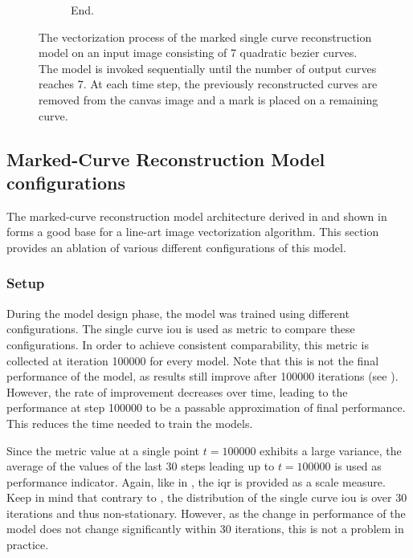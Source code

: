 \begin{figure}
\begin{subfigure}{.1\textwidth}
        \caption{End.}
    \end{subfigure}
    \caption{The vectorization process of the marked single curve reconstruction model on an input image consisting of 7 quadratic bezier curves. The model is invoked sequentially until the number of output curves reaches 7. At each time step, the previously reconstructed curves are removed from the canvas image and a mark is placed on a remaining curve.}
    \label{fig:marked.3.process}
\end{figure}


\subsection{Marked-Curve Reconstruction Model configurations}
\label{subsec:ablation.configs}

The marked-curve reconstruction model architecture derived in  and shown in  forms a good base for a line-art image vectorization algorithm. This section provides an ablation of various different configurations of this model.

\subsubsection{Setup}

During the model design phase, the model was trained using different configurations. The single curve \gls{iou} is used as metric to compare these configurations. In order to achieve consistent comparability, this metric is collected at iteration \num{100000} for every model. Note that this is not the final performance of the model, as results still improve after \num{100000} iterations (see ). However, the rate of improvement decreases over time, leading to the performance at step \num{100000} to be a passable approximation of final performance. This reduces the time needed to train the models.

Since the metric value at a single point $t=100000$ exhibits a large variance, the average of the values of the last 30 steps leading up to $t=100000$ is used as performance indicator. Again, like in , the \gls{iqr} is provided as a scale measure. Keep in mind that contrary to , the distribution of the single curve \gls{iou} is over 30 iterations and thus non-stationary. However, as the change in performance of the model does not change significantly within 30 iterations, this is not a problem in practice.

